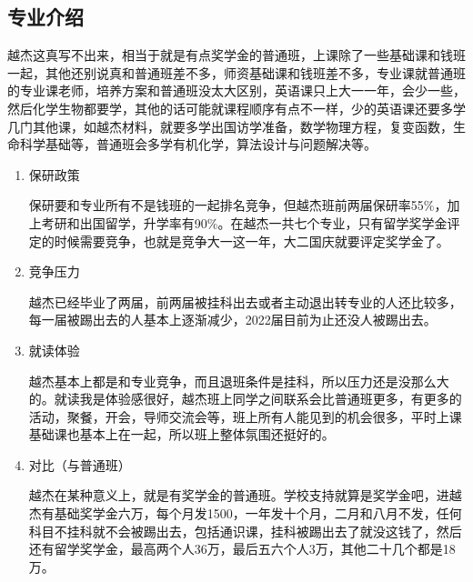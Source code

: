 \documentclass[zihao=-4,fontset=none]{Beautybook-CN}
\begin{document}
\subsection{专业介绍}
越杰这真写不出来，相当于就是有点奖学金的普通班，上课除了一些基础课和钱班一起，其他还别说真和普通班差不多，师资基础课和钱班差不多，专业课就普通班的专业课老师，培养方案和普通班没太大区别，英语课只上大一一年，会少一些，然后化学生物都要学，其他的话可能就课程顺序有点不一样，少的英语课还要多学几门其他课，如越杰材料，就要多学出国访学准备，数学物理方程，复变函数，生命科学基础等，普通班会多学有机化学，算法设计与问题解决等。
\begin{enumerate}
		      	      
	\item 保研政策
	      	      	      
	      保研要和专业所有不是钱班的一起排名竞争，但越杰班前两届保研率55\%，加上考研和出国留学，升学率有90\%。在越杰一共七个专业，只有留学奖学金评定的时候需要竞争，也就是竞争大一这一年，大二国庆就要评定奖学金了。
	      	      	      
	\item 竞争压力
	      	      	      
	      越杰已经毕业了两届，前两届被挂科出去或者主动退出转专业的人还比较多，每一届被踢出去的人基本上逐渐减少，2022届目前为止还没人被踢出去。	      	      
	\item 就读体验
	      	      	      
	      越杰基本上都是和专业竞争，而且退班条件是挂科，所以压力还是没那么大的。就读我是体验感很好，越杰班上同学之间联系会比普通班更多，有更多的活动，聚餐，开会，导师交流会等，班上所有人能见到的机会很多，平时上课基础课也基本上在一起，所以班上整体氛围还挺好的。
	      	      	      
	\item 对比（与普通班）
	      	      	      
	      越杰在某种意义上，就是有奖学金的普通班。学校支持就算是奖学金吧，进越杰有基础奖学金六万，每个月发1500，一年发十个月，二月和八月不发，任何科目不挂科就不会被踢出去，包括通识课，挂科被踢出去了就没这钱了，然后还有留学奖学金，最高两个人36万，最后五六个人3万，其他二十几个都是18万。
\end{enumerate}
\end{document}
